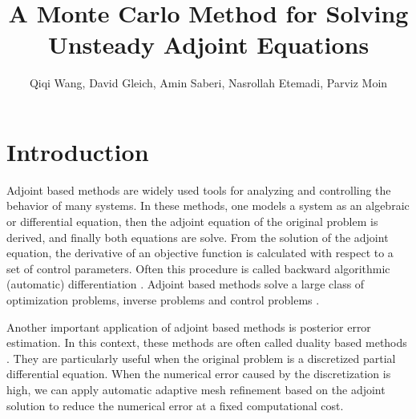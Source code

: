 \documentclass[a4paper,11pt]{article}
\title{A Monte Carlo Method for Solving Unsteady Adjoint Equations}
\author{Qiqi Wang, David Gleich, Amin Saberi, Nasrollah Etemadi, Parviz Moin}
\date{}
\theoremstyle{remark}
\theoremstyle{definition}
\begin{document}
 \maketitle








\section*{Introduction}
    Adjoint based methods are widely used tools for analyzing and
    controlling the behavior of many systems.  In these methods, one models a
    system as an algebraic or differential equation, then the adjoint equation
    of the original problem is derived, and finally both equations are solve.
    From the solution of the adjoint equation, the derivative of an objective
    function is calculated with respect to a set of control parameters.  Often
    this procedure is called backward algorithmic (automatic) differentiation
    \cite{Griewank2003}.  Adjoint based methods solve a large class of
    optimization problems, inverse problems and control problems
    \cite{Bewley2001,Choi1993,Giles2000,Gunzburger1999,Gunzburger2000,
    Jameson1988}.
    
    Another important application of adjoint based methods is posterior
    error estimation.  In this context, these methods are often called
    duality based methods \cite{Pierce2002,Giles2002,Hoffman2004}. 
    They are particularly useful when the original problem is a 
    discretized partial differential equation.  When the numerical error
    caused by the discretization is high, we can apply automatic adaptive mesh
    refinement \cite{Hoffman2005} based on the adjoint solution to
    reduce the numerical error at a fixed computational cost.
    
\end{document}

